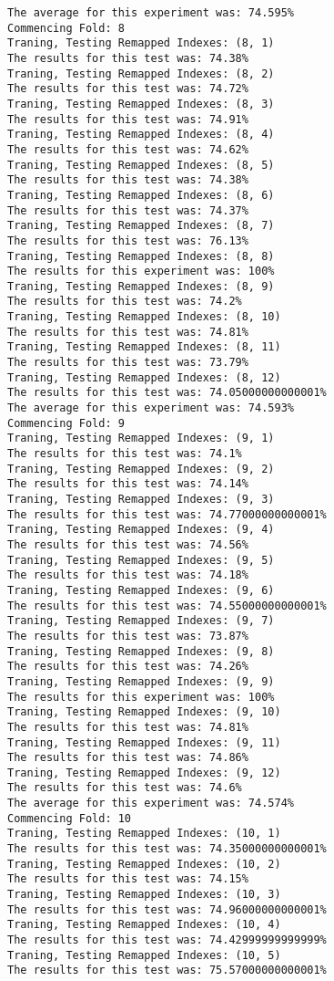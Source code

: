 \begin{lstlisting}[basicstyle=\tiny]
The average for this experiment was: 74.595%
Commencing Fold: 8
Traning, Testing Remapped Indexes: (8, 1)
The results for this test was: 74.38%
Traning, Testing Remapped Indexes: (8, 2)
The results for this test was: 74.72%
Traning, Testing Remapped Indexes: (8, 3)
The results for this test was: 74.91%
Traning, Testing Remapped Indexes: (8, 4)
The results for this test was: 74.62%
Traning, Testing Remapped Indexes: (8, 5)
The results for this test was: 74.38%
Traning, Testing Remapped Indexes: (8, 6)
The results for this test was: 74.37%
Traning, Testing Remapped Indexes: (8, 7)
The results for this test was: 76.13%
Traning, Testing Remapped Indexes: (8, 8)
The results for this experiment was: 100%
Traning, Testing Remapped Indexes: (8, 9)
The results for this test was: 74.2%
Traning, Testing Remapped Indexes: (8, 10)
The results for this test was: 74.81%
Traning, Testing Remapped Indexes: (8, 11)
The results for this test was: 73.79%
Traning, Testing Remapped Indexes: (8, 12)
The results for this test was: 74.05000000000001%
The average for this experiment was: 74.593%
Commencing Fold: 9
Traning, Testing Remapped Indexes: (9, 1)
The results for this test was: 74.1%
Traning, Testing Remapped Indexes: (9, 2)
The results for this test was: 74.14%
Traning, Testing Remapped Indexes: (9, 3)
The results for this test was: 74.77000000000001%
Traning, Testing Remapped Indexes: (9, 4)
The results for this test was: 74.56%
Traning, Testing Remapped Indexes: (9, 5)
The results for this test was: 74.18%
Traning, Testing Remapped Indexes: (9, 6)
The results for this test was: 74.55000000000001%
Traning, Testing Remapped Indexes: (9, 7)
The results for this test was: 73.87%
Traning, Testing Remapped Indexes: (9, 8)
The results for this test was: 74.26%
Traning, Testing Remapped Indexes: (9, 9)
The results for this experiment was: 100%
Traning, Testing Remapped Indexes: (9, 10)
The results for this test was: 74.81%
Traning, Testing Remapped Indexes: (9, 11)
The results for this test was: 74.86%
Traning, Testing Remapped Indexes: (9, 12)
The results for this test was: 74.6%
The average for this experiment was: 74.574%
Commencing Fold: 10
Traning, Testing Remapped Indexes: (10, 1)
The results for this test was: 74.35000000000001%
Traning, Testing Remapped Indexes: (10, 2)
The results for this test was: 74.15%
Traning, Testing Remapped Indexes: (10, 3)
The results for this test was: 74.96000000000001%
Traning, Testing Remapped Indexes: (10, 4)
The results for this test was: 74.42999999999999%
Traning, Testing Remapped Indexes: (10, 5)
The results for this test was: 75.57000000000001%

\end{lstlisting}
